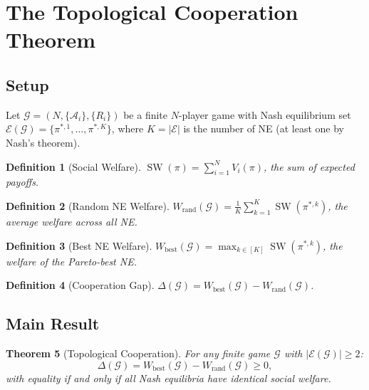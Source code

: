 \documentclass[11pt,a4paper]{article}
\newtheorem{theorem}{Theorem}[section]
\newtheorem{definition}[theorem]{Definition}
\DeclareMathOperator{\SW}{SW}
\begin{document}
\section{The Topological Cooperation Theorem}
\label{sec:theorem}

\subsection{Setup}

Let $\mathcal{G} = (N, \{\mathcal{A}_i\}, \{R_i\})$ be a finite
$N$-player game with Nash equilibrium set
$\mathcal{E}(\mathcal{G}) = \{\pi^{*,1}, \ldots, \pi^{*,K}\}$,
where $K = |\mathcal{E}|$ is the number of NE (at least one by
Nash's theorem).

\begin{definition}[Social Welfare]
$\SW(\pi) = \sum_{i=1}^N V_i(\pi)$, the sum of expected payoffs.
\end{definition}

\begin{definition}[Random NE Welfare]
$W_{\text{rand}}(\mathcal{G}) = \frac{1}{K}\sum_{k=1}^K \SW(\pi^{*,k})$,
the average welfare across all NE.
\end{definition}

\begin{definition}[Best NE Welfare]
$W_{\text{best}}(\mathcal{G}) = \max_{k \in [K]} \SW(\pi^{*,k})$,
the welfare of the Pareto-best NE.
\end{definition}

\begin{definition}[Cooperation Gap]
$\Delta(\mathcal{G}) = W_{\text{best}}(\mathcal{G}) - W_{\text{rand}}(\mathcal{G})$.
\end{definition}

\subsection{Main Result}

\begin{theorem}[Topological Cooperation]\label{thm:main}
For any finite game $\mathcal{G}$ with $|\mathcal{E}(\mathcal{G})| \geq 2$:
\begin{equation}
    \Delta(\mathcal{G}) = W_{\text{best}}(\mathcal{G}) - W_{\text{rand}}(\mathcal{G}) \geq 0,
\end{equation}
with equality if and only if all Nash equilibria have identical social welfare.
\end{theorem}
\end{document}
